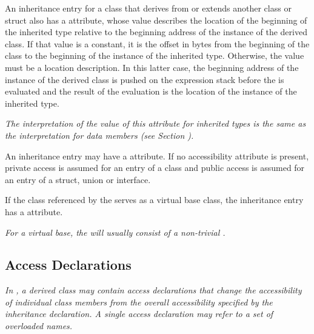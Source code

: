 An\hypertarget{chap:DWATdatamemberlocationinheritedmemberlocation}{}
inheritance entry
for a class that derives from or extends
another class or struct also has a
\DWATdatamemberlocationDEFN{} attribute,
whose value describes the location of the beginning
of the inherited type relative to the beginning address of the
instance of the derived class. If that value is a constant, it is the offset
in bytes from the beginning of the class to the beginning of
the instance of the inherited type. Otherwise, the value must be a location
description. In this latter case, the beginning address of
the instance of the derived class is pushed on the expression stack before
the 
is evaluated and the result of the
evaluation is the location of the instance of the inherited type.

\textit{The interpretation of the value of this attribute for
inherited types is the same as the interpretation for data
members
(see Section ).  }

An\hypertarget{chap:DWATaccessibilitycppinheritedmembers}{}
inheritance entry may have a
\hyperlink{chap:DWATaccessibilityattribute}{\DWATaccessibilityNAME}
attribute.
If no accessibility attribute is present, private access
is assumed for an entry of a class and public access is
assumed for an entry of a struct, union or interface.

If the class referenced by the 
serves as a  virtual base class, the
inheritance entry has a
\hyperlink{chap:DWATvirtualityvirtualityindication}{\DWATvirtualityNAME}
attribute.

\textit{For a  virtual base, the
will usually consist of a non-trivial
.}

\subsection{Access Declarations}
\label{chap:accessdeclarations}

\textit{In , a derived class may contain access declarations that
change the accessibility of individual class members from the
overall accessibility specified by the inheritance declaration.
A single access declaration may refer to a set of overloaded
names.}

